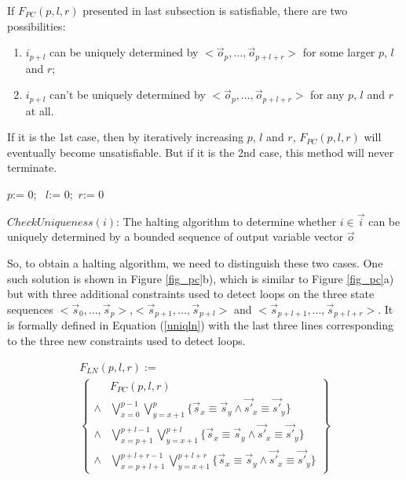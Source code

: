 \documentclass[twocolumn]{article}
\begin{document}
If $F_{PC}(p,l,r)$ presented in last subsection is satisfiable,
there are two possibilities:
\begin{enumerate}
 \item 
$i_{p+l}$ can be uniquely determined by $<\vec{o}_{p},\dots,\vec{o}_{p+l+r}>$ for some larger $p$, $l$ and $r$;
 \item 
$i_{p+l}$ can't be uniquely determined by $<\vec{o}_{p},\dots,\vec{o}_{p+l+r}>$ for any $p$, $l$ and $r$ at all.
\end{enumerate}

If it is the 1st case,
then by iteratively increasing  $p$, $l$ and $r$,
$F_{PC}(p,l,r)$ will eventually become unsatisfiable.
But if it is the 2nd case,
this method will never terminate.

\begin{algorithm}[t]
\SetAlgoVlined
{}
$p$:= 0; ~$l$:= 0;~$r$:= 0\;
\caption{$CheckUniqueness(i)$: The halting algorithm to determine 
whether $i\in\vec{i}$ can be uniquely determined by a bounded sequence of output variable vector $\vec{o}$}
\label{alg_pcln}
\end{algorithm}

So,
to obtain a halting algorithm,
we need to distinguish these two cases.
One such solution is shown in Figure \ref{fig_pc}b),
which is similar to Figure \ref{fig_pc}a) but with three additional constraints used to detect loops 
on the three state sequences $<\vec{s}_{0},\dots,\vec{s}_{p}>$,$<\vec{s}_{p+1},\dots,\vec{s}_{p+l}>$ and 
$<\vec{s}_{p+l+1},\dots,\vec{s}_{p+l+r}>$.
It is formally defined in Equation (\ref{uniqln}) with the last three lines corresponding to the three new constraints used to detect loops.

\begin{multline}\label{uniqln}
F_{LN}(p,l,r):=\\
\left\{
\begin{array}{cc}
&F_{PC}(p,l,r)\\
\wedge&\bigvee_{x=0}^{p-1}\bigvee_{y=x+1}^{p} \{\vec{s}_x\equiv \vec{s}_y\wedge \vec{s'}_x\equiv \vec{s'}_y\} \\
\wedge&\bigvee_{x=p+1}^{p+l-1}\bigvee_{y=x+1}^{p+l} \{\vec{s}_x\equiv \vec{s}_y\wedge \vec{s'}_x\equiv \vec{s'}_y\} \\
\wedge&\bigvee_{x=p+l+1}^{p+l+r-1}\bigvee_{y=x+1}^{p+l+r} \{\vec{s}_x\equiv \vec{s}_y\wedge \vec{s'}_x\equiv \vec{s'}_y\}
\end{array}
\right\}
\end{multline}
\end{document}
